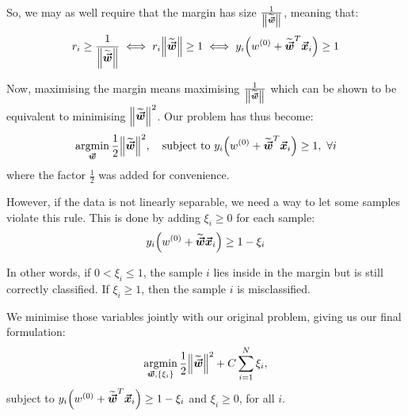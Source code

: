 \documentclass[a4paper]{article}
\begin{document}
{    So, we may as well require that the margin has size $\frac{1}{\left\|\widetilde{\bvec{w}}\right\|}$, meaning that: 
    \[r_i \geq \frac{1}{\left\|\widetilde{\bvec{w}}\right\|} \iff r_i \left\|\widetilde{\bvec{w}}\right\| \geq 1 \iff y_i \left(w^{\left(0\right)} + \widetilde{\bvec{w}}^T \bvec{x}_i\right) \geq 1\]

    Now, maximising the margin means maximising $\frac{1}{\left\|\widetilde{\bvec{w}}\right\|}$ which can be shown to be equivalent to minimising $\left\|\widetilde{\bvec{w}}\right\|^2$. Our problem has thus become: 
    \[\argmin_{\bvec{w}} \frac{1}{2} \left\|\widetilde{\bvec{w}}\right\|^2, \mathspace \text{subject to } y_i \left(w^{\left(0\right)} + \widetilde{\bvec{w}}^T \bvec{x}_i\right) \geq 1, \ \forall i\]
    where the factor $\frac{1}{2}$ was added for convenience.

    However, if the data is not linearly separable, we need a way to let some samples violate this rule. This is done by adding  $\xi_i \geq 0$ for each sample: 
    \[y_i \left(w^{\left(0\right)} + \widetilde{\bvec{w}} \bvec{x}_i\right) \geq 1 - \xi_i\]

    In other words, if $0 < \xi_i \leq 1$, the sample $i$ lies inside in the margin but is still correctly classified. If $\xi_i \geq 1$, then the sample $i$ is misclassified. 

    We minimise those variables jointly with our original problem, giving us our final formulation:
    \[\argmin_{\bvec{w}, \left\{\xi_i\right\}} \frac{1}{2} \left\|\widetilde{\bvec{w}}\right\|^2 + C \sum_{i=1}^{N} \xi_i, \]
    subject to $y_i \left(w^{\left(0\right)} + \widetilde{\bvec{w}}^T \bvec{x}_i\right) \geq 1 - \xi_i$ and $\xi_i \geq 0$, for all $i$.
}

\end{document}

